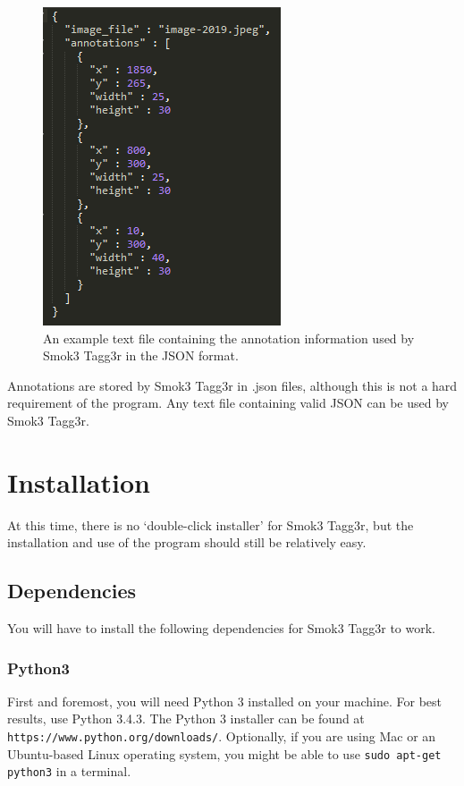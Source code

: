 \documentclass{article}
\begin{document}
  \begin{figure}[h!]
    \centering
    \includegraphics[width=.4\linewidth]{example_annotation}
    \caption{An example text file containing the annotation information used by Smok3 Tagg3r in the JSON format.}
    \label{fig:example_annotation}
  \end{figure}

Annotations are stored by Smok3 Tagg3r in .json files, although this is not a hard requirement of the program. Any text file containing valid JSON can be used by Smok3 Tagg3r.

\section{Installation}
At this time, there is no `double-click installer' for Smok3 Tagg3r, but the installation and use of the program should still be relatively easy.

\subsection{Dependencies}
You will have to install the following dependencies for Smok3 Tagg3r to work.

\subsubsection{Python3}
First and foremost, you will need Python 3 installed on your machine. For best results, use Python 3.4.3. The Python 3 installer can be found at \texttt{https://www.python.org/downloads/}. Optionally, if you are using Mac or an Ubuntu-based Linux operating system, you might be able to use \texttt{sudo apt-get python3} in a terminal.
\end{document}
